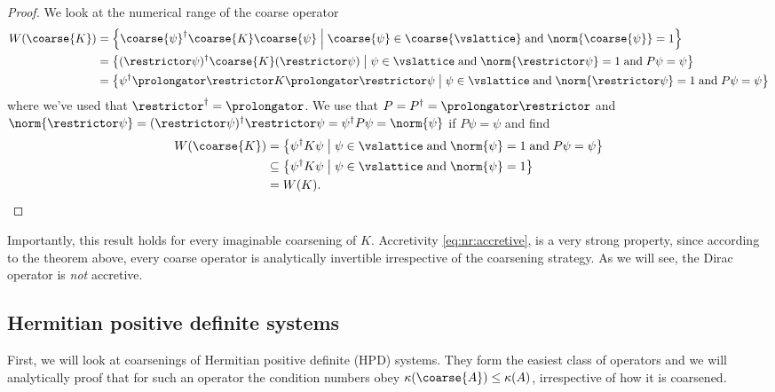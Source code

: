 \begin{proof}
We look at the numerical range of the coarse operator
\begin{align*}
W({\coarse{K}})
&= \left\{ \coarse{\psi}^\dagger \coarse{K} \coarse{\psi} \; \middle| \; \coarse{\psi} \in \coarse{\vslattice} \; \text{and} \; \norm{\coarse{\psi}} = 1 \right\} \\
&= \left\{ (\restrictor \psi)^\dagger \coarse{K} (\restrictor \psi) \; \middle| \; \psi \in \vslattice \; \text{and} \; \norm{\restrictor \psi} = 1 \; \text{and} \; P \psi = \psi \right\} \\
&= \left\{ \psi^\dagger \prolongator \restrictor K \prolongator \restrictor \psi \; \middle| \; \psi \in \vslattice \; \text{and} \; \norm{\restrictor \psi} = 1 \; \text{and} \; P \psi = \psi \right\}
\end{align*}
where we've used that $\restrictor^\dagger = \prolongator$. We use that $P = P^\dagger = \prolongator \restrictor$ and $\norm{\restrictor \psi} = (\restrictor \psi)^\dagger \restrictor \psi = \psi^\dagger P \psi = \norm{\psi}$ if $P \psi = \psi$ and find
\begin{align*}
W({\coarse{K}})
&= \left\{ \psi^\dagger K \psi \; \middle| \; \psi \in \vslattice \; \text{and} \; \norm{\psi} = 1 \; \text{and} \; P \psi = \psi \right\} \\
&\subseteq \left\{ \psi^\dagger K \psi \; \middle| \; \psi \in \vslattice \; \text{and} \; \norm{\psi} = 1 \right\} \\
&= W({K}).
\end{align*}
\end{proof}

Importantly, this result holds for every imaginable coarsening of $K$.
Accretivity \cref{eq:nr:accretive}, is a very strong property, since according to the theorem above, every coarse operator is analytically invertible irrespective of the coarsening strategy.
As we will see, the Dirac operator is \emph{not} accretive.

\subsection{Hermitian positive definite systems}

First, we will look at coarsenings of Hermitian positive definite (HPD) systems.
They form the easiest class of operators and we will analytically proof that for such an operator the condition numbers obey $\kappa(\coarse{A}) \leq \kappa(A)$, irrespective of how it is coarsened.

